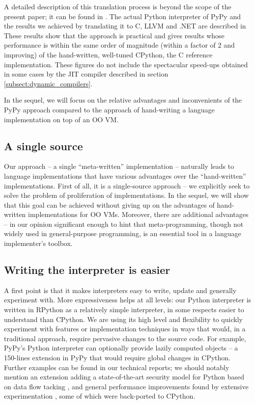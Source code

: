 \documentclass[utf8x]{llncs}
\begin{document}
A detailed description of this translation process is beyond the scope of the
present paper; it can be found in \cite{pypyvmconstruction}.  The actual Python
interpreter of PyPy and the results we achieved by translating it to C, LLVM
\cite{LLVM} and .NET are described in \cite{architecture} \cite{translationdoc}
These results show that the
approach is practical and gives results whose performance is within the same
order of magnitude (within a factor of 2 and improving) of the hand-written,
well-tuned CPython, the C reference implementation.  These figures do not
include the spectacular speed-ups obtained in some cases by the JIT compiler
described in section \ref{subsect:dynamic_compilers}.

In the sequel, we will focus on the relative advantages and
inconvenients of the PyPy approach compared to the approach of
hand-writing a language implementation on top of an OO VM.


\subsection{A single source}

Our approach -- a single ``meta-written'' implementation -- naturally
leads to language implementations that have various advantages over the
``hand-written'' implementations.  First of all, it is a single-source
approach -- we explicitly seek to solve the problem of proliferation of
implementations.  In the sequel, we will show that this goal can be
achieved without giving up on the advantages of hand-written
implementations for OO VMs.  Moreover, there are additional advantages
-- in our opinion significant enough to hint that meta-programming,
though not widely used in general-purpose programming, is an essential
tool in a language implementer's toolbox.

\subsection{Writing the interpreter is easier}

A first point is that it makes interpreters easy to write, update and
generally experiment with.  More expressiveness helps at all levels: our
Python interpreter is written in RPython as a relatively simple
interpreter, in some respects easier to understand than CPython.  We are
using its high level and flexibility to quickly experiment with features
or implementation techniques in ways that would, in a traditional
approach, require pervasive changes to the source code.  For example,
PyPy's Python interpreter can optionally provide lazily computed objects
-- a 150-lines extension in PyPy that would require global changes in
CPython.  Further examples can be found in our technical reports; we
should notably mention an extension adding a state-of-the-art security
model for Python based on data flow tacking \cite{D12.1}, and general
performance improvements found by extensive experimentation \cite{D06.1}, some
of which were back-ported to CPython.
\end{document}
